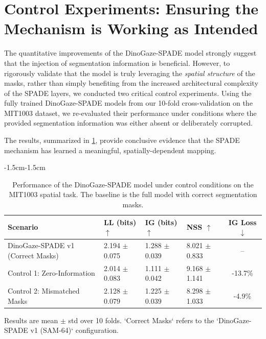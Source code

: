 \section[Control Experiments: Validating the Mechanism]{Control Experiments: Ensuring the Mechanism is Working as Intended}
The quantitative improvements of the DinoGaze-SPADE model strongly suggest that the injection of segmentation information is beneficial. However, to rigorously validate that the model is truly leveraging the \textit{spatial structure} of the masks, rather than simply benefiting from the increased architectural complexity of the SPADE layers, we conducted two critical control experiments. Using the fully trained DinoGaze-SPADE models from our 10-fold cross-validation on the MIT1003 dataset, we re-evaluated their performance under conditions where the provided segmentation information was either absent or deliberately corrupted.

The results, summarized in \cref{tab:results_controls}, provide conclusive evidence that the SPADE mechanism has learned a meaningful, spatially-dependent mapping.

\begin{table}[h!]
\begin{adjustwidth}{-1.5cm}{-1.5cm} 
\centering
\caption{
    Performance of the DinoGaze-SPADE model under control conditions on the MIT1003 spatial task. The baseline is the full model with correct segmentation masks.
}
\label{tab:results_controls}
\begin{tabular}{@{}l l l l c@{}}
\toprule
\textbf{Scenario} & \textbf{LL (bits)} $\uparrow$ & \textbf{IG (bits)} $\uparrow$ & \textbf{NSS} $\uparrow$ & \textbf{IG Loss} $\downarrow$ \\
\midrule
DinoGaze-SPADE v1 (Correct Masks) & 2.194 $\pm$ 0.075 & 1.288 $\pm$ 0.039 & 8.021 $\pm$ 0.833 & -- \\
Control 1: Zero-Information      & 2.014 $\pm$ 0.083 & 1.111 $\pm$ 0.042 & 9.168 $\pm$ 1.141 & -13.7\% \\
Control 2: Mismatched Masks    & 2.128 $\pm$ 0.079 & 1.225 $\pm$ 0.039 & 8.298 $\pm$ 1.033 & -4.9\% \\
\bottomrule
\end{tabular}
\par\medskip
\footnotesize{
    Results are mean $\pm$ std over 10 folds. `Correct Masks` refers to the `DinoGaze-SPADE v1 (SAM-64)` configuration.
}
\end{adjustwidth}
\end{table}

